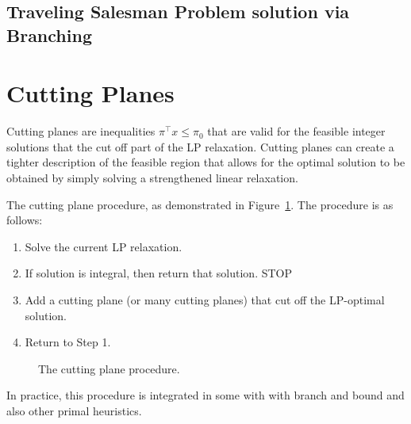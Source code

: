 
\subsection{Traveling Salesman Problem solution via Branching}






\section{Cutting Planes}
Cutting planes are inequalities $\pi^\top x \leq \pi_0$ that are valid for the feasible integer solutions that the cut off part of the LP relaxation.  Cutting planes can create a tighter description of the feasible region that allows for the optimal solution to be obtained by simply solving a strengthened linear relaxation. 

The cutting plane procedure, as demonstrated in Figure~\ref{fig:cutting-plane-procudure}.  The procedure is as follows:
\begin{enumerate}
\item Solve the current LP relaxation.
\item If solution is integral, then return that solution.  STOP
\item Add a cutting plane (or many cutting planes) that cut off the LP-optimal solution.
\item Return to Step 1.
\end{enumerate}

\begin{figure}[H]
\caption{The cutting plane procedure.}
\label{fig:cutting-plane-procudure}
\end{figure}

In practice, this procedure is integrated in some with with branch and bound and also other primal heuristics.


